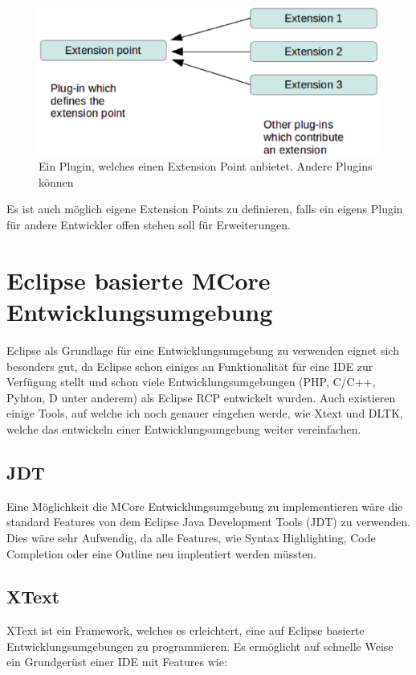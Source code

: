 \begin{figure}[H]
	\centering
		\includegraphics[scale=0.5]{platform/extensionpoint.eps}
		\caption{Ein Plugin, welches einen Extension Point anbietet. Andere Plugins können}
		\label{fig:extensionpoint}
\end{figure}

Es ist auch möglich eigene Extension Points zu definieren, falls ein eigens Plugin für andere Entwickler offen stehen soll für Erweiterungen.

\section{Eclipse basierte MCore Entwicklungsumgebung}

Eclipse als Grundlage für eine Entwicklungsumgebung zu verwenden eignet sich besonders gut, da Eclipse schon einiges an Funktionalität für eine IDE zur Verfügung stellt und schon viele Entwicklungsumgebungen (PHP, C/C++, Pyhton, D unter anderem) als Eclipse RCP entwickelt wurden. Auch existieren einige Tools, auf welche ich noch genauer eingehen werde, wie Xtext und DLTK, welche das entwickeln einer Entwicklungsumgebung weiter vereinfachen.

\subsection{JDT}
Eine Möglichkeit die MCore Entwicklungsumgebung zu implementieren wäre die standard Features von dem Eclipse Java Development Tools (JDT) zu verwenden. Dies wäre sehr Aufwendig, da alle Features, wie Syntax Highlighting, Code Completion oder eine Outline neu implentiert werden müssten.

\subsection{XText}
XText ist ein Framework, welches es erleichtert, eine auf Eclipse basierte Entwicklungsumgebungen zu programmieren. Es ermöglicht auf schnelle Weise ein Grundgerüst einer IDE mit Features wie:

